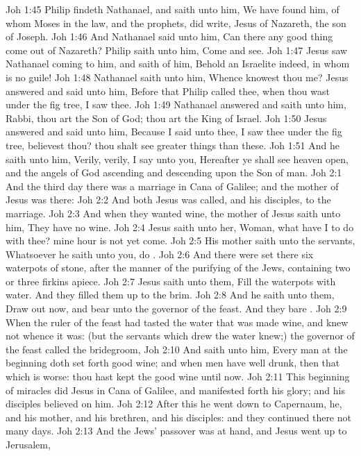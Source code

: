 \vs Joh 1:45 Philip findeth Nathanael, and saith unto him, We have found him, of whom Moses in the law, and the prophets, did write, Jesus of Nazareth, the son of Joseph.
\vs Joh 1:46 And Nathanael said unto him, Can there any good thing come out of Nazareth? Philip saith unto him, Come and see.
\vs Joh 1:47 Jesus saw Nathanael coming to him, and saith of him, Behold an Israelite indeed, in whom is no guile!
\vs Joh 1:48 Nathanael saith unto him, Whence knowest thou me? Jesus answered and said unto him, Before that Philip called thee, when thou wast under the fig tree, I saw thee.
\vs Joh 1:49 Nathanael answered and saith unto him, Rabbi, thou art the Son of God; thou art the King of Israel.
\vs Joh 1:50 Jesus answered and said unto him, Because I said unto thee, I saw thee under the fig tree, believest thou? thou shalt see greater things than these.
\vs Joh 1:51 And he saith unto him, Verily, verily, I say unto you, Hereafter ye shall see heaven open, and the angels of God ascending and descending upon the Son of man.
\vs Joh 2:1 And the third day there was a marriage in Cana of Galilee; and the mother of Jesus was there:
\vs Joh 2:2 And both Jesus was called, and his disciples, to the marriage.
\vs Joh 2:3 And when they wanted wine, the mother of Jesus saith unto him, They have no wine.
\vs Joh 2:4 Jesus saith unto her, Woman, what have I to do with thee? mine hour is not yet come.
\vs Joh 2:5 His mother saith unto the servants, Whatsoever he saith unto you, do .
\vs Joh 2:6 And there were set there six waterpots of stone, after the manner of the purifying of the Jews, containing two or three firkins apiece.
\vs Joh 2:7 Jesus saith unto them, Fill the waterpots with water. And they filled them up to the brim.
\vs Joh 2:8 And he saith unto them, Draw out now, and bear unto the governor of the feast. And they bare .
\vs Joh 2:9 When the ruler of the feast had tasted the water that was made wine, and knew not whence it was: (but the servants which drew the water knew;) the governor of the feast called the bridegroom,
\vs Joh 2:10 And saith unto him, Every man at the beginning doth set forth good wine; and when men have well drunk, then that which is worse:  thou hast kept the good wine until now.
\vs Joh 2:11 This beginning of miracles did Jesus in Cana of Galilee, and manifested forth his glory; and his disciples believed on him.
\vs Joh 2:12 After this he went down to Capernaum, he, and his mother, and his brethren, and his disciples: and they continued there not many days.
\vs Joh 2:13 And the Jews' passover was at hand, and Jesus went up to Jerusalem,
